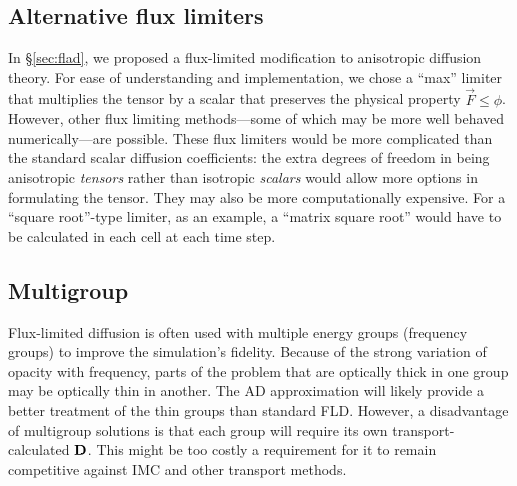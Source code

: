 \subsection{Alternative flux limiters}

In \S\ref{sec:flad}, we proposed a flux-limited modification to anisotropic
diffusion theory. For ease of understanding and implementation, we chose a
``max'' limiter that multiplies the tensor by a scalar that preserves the
physical property $\vec{F} \le \phi$. However, other flux limiting
methods---some of which may be more well behaved numerically---are possible.
These flux limiters would be more complicated than the standard scalar diffusion
coefficients: the extra degrees of freedom in being anisotropic
\emph{tensors} rather than isotropic \emph{scalars} would allow more options in
formulating the tensor.
They may also be more computationally expensive. For a ``square root''-type
limiter, as an
example, a ``matrix square root'' would have to be calculated in each cell at
each time step.


\subsection{Multigroup}

Flux-limited diffusion is often used with multiple energy groups (frequency
groups) to improve the simulation's fidelity.
Because of the strong variation of opacity with
frequency, parts of the problem that are optically thick in one group may be optically
thin in another. The AD approximation will likely provide a better treatment of
the thin groups than standard FLD. However, a disadvantage of multigroup solutions is that
each group will require its own transport-calculated $\mathbf{D}$. This might be
too costly a requirement for it to remain competitive against IMC and other
transport methods.

